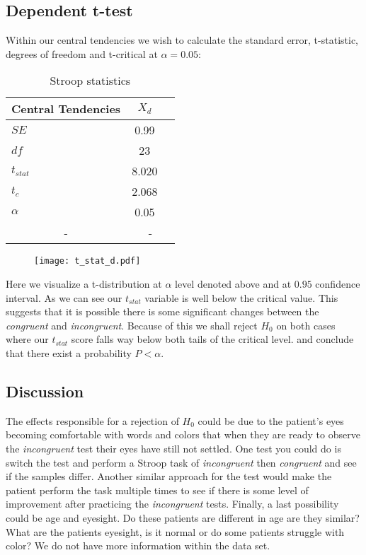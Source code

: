 \documentclass[8pt]{article}
\newcommand{\8}{\bar}
\begin{document}
\subsection{Dependent t-test} 
Within our central tendencies we wish to calculate the standard error, t-statistic, degrees of freedom and t-critical at $\alpha = 0.05$: 
\begin{table}[htbp]\centering \caption{Stroop statistics \label{sumstat}}
\begin{tabular}{l c c  }\hline\hline
\multicolumn{1}{c}{\textbf{Central Tendencies}}  & $X_{d}$ \\ \hline
$SE$ & 0.99\\
$df$ & 23\\
$t_{stat}$ &  8.020 \\ 
$t_{c}$ &  2.068\\ 
$\alpha$ & 0.05\\
\multicolumn{1}{c}{-} & \multicolumn{2}{c}{-}\\ \hline
\end{tabular}
\end{table}
\begin{figure}[H]
\texttt{[image: t\_stat\_d.pdf]} 
\end{figure} 
Here we visualize a t-distribution at $\alpha$ level denoted above and at $0.95$ confidence interval. As we can see our $t_{stat}$ variable is well below the critical value. This suggests that it is possible there is some significant changes between the \textit{congruent} and \textit{incongruent}. Because of this we shall reject $H_{0}$ on both cases where our $t_{stat}$ score falls way below both tails of the critical level. and conclude that there exist a probability $P < \alpha$.
\subsection{Discussion}
The effects responsible for a rejection of $H_{0}$ could be due to the patient's eyes becoming comfortable with words and colors that when they are ready to observe the \textit{incongruent} test their eyes have still not settled. One test you could do is switch the test and perform a Stroop task of \textit{incongruent} then \textit{congruent} and see if the samples differ. Another similar approach for the test would make the patient perform the task multiple times to see if there is some level of improvement after practicing the \textit{incongruent} tests. Finally, a last possibility could be age and eyesight. Do these patients are different in age are they similar? What are the patients eyesight, is it normal or do some patients struggle with color? We do not have more information within the data set.
\end{document}
